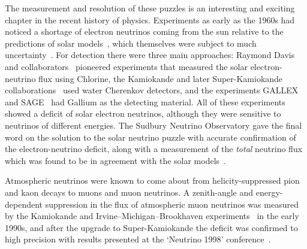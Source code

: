The measurement and resolution of these puzzles is an interesting and exciting
chapter in the recent history of physics. Experiments as early as the 1960s
had noticed a shortage of electron neutrinos coming from the sun relative to
the predictions of solar models~\cite{RevModPhys.60.297, 1988ApJ...335..415T,
  RevModPhys.64.885, RevModPhys.67.781}, which themselves were subject to much
uncertainty~\cite{Morrison:1992bz}. For detection there were three main
approaches: Raymond Davis and collaborators~\cite{PhysRevLett.12.303}
pioneered experiments that measured the solar electron-neutrino flux using
Chlorine, the Kamiokande and later Super-Kamiokande
collaborations~\cite{Hirata:1989zj, Hirata:1990xa} used water Cherenkov
detectors, and the experiments GALLEX~\cite{Hampel:1998xg} and
SAGE~\cite{Abdurashitov:1999zd} had Gallium as the detecting material. All of
these experiments showed a deficit of solar electron neutrinos, although they
were sensitive to neutrinos of different energies. The Sudbury Neutrino
Observatory gave the final word on the solution to the solar neutrino puzzle
with accurate confirmation of the electron-neutrino deficit, along with a
measurement of the \textit{total} neutrino flux which was found to be in
agreement with the solar models~\cite{Ahmad:2001an, Ahmad:2002jz}.

Atmospheric neutrinos were known to come about from helicity-suppressed pion and
kaon decays to muons and muon neutrinos. A zenith-angle and energy-dependent
suppression in the flux of atmospheric muon neutrinos was measured by the
Kamiokande and Irvine--Michigan--Brookhaven experiments~\cite{Hirata:1992ku,
  BeckerSzendy:1995vr} in the early 1990s, and after the upgrade to
Super-Kamiokande the deficit was confirmed to high precision with results
presented at the `Neutrino 1998' conference~\cite{Fukuda:1998mi,
  vonFeilitzsch:2003mh, shiozawa:2002, Smy:2002rz}.

